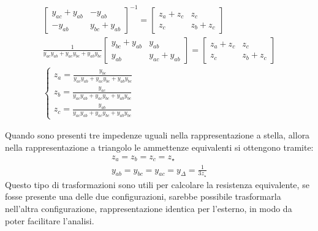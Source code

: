 \documentclass{article}
\numberwithin{equation}{subsection}
\begin{document}
\begin{gather*}
    \begin{bmatrix}
        y_{ac}+y_{ab}&-y_{ab}\\-y_{ab}&y_{bc}+y_{ab}
    \end{bmatrix}^{-1}=\begin{bmatrix}
        z_a+z_c&z_c\\z_c&z_b+z_c
    \end{bmatrix}\\
    \displaystyle\frac{1}{y_{ac}y_{ab}+y_{ac}y_{bc}+y_{ab}y_{bc}}\begin{bmatrix}
        y_{bc}+y_{ab}&y_{ab}\\y_{ab}&y_{ac}+y_{ab}
    \end{bmatrix}=\begin{bmatrix}
        z_a+z_c&z_c\\z_c&z_b+z_c
    \end{bmatrix}\\
    \begin{cases}
        z_a=\displaystyle\frac{y_{bc}}{y_{ac}y_{ab}+y_{ac}y_{bc}+y_{ab}y_{bc}}\\
        z_b=\displaystyle\frac{y_{ac}}{y_{ac}y_{ab}+y_{ac}y_{bc}+y_{ab}y_{bc}}\\
        z_c=\displaystyle\frac{y_{ab}}{y_{ac}y_{ab}+y_{ac}y_{bc}+y_{ab}y_{bc}}
    \end{cases}
\end{gather*}


Quando sono presenti tre impedenze uguali nella rappresentazione a stella, allora nella rappresentazione a triangolo le ammettenze equivalenti si ottengono tramite:
\begin{gather*}
    z_a=z_b=z_c=z_{\star}\\
    y_{ab}=y_{bc}=y_{ac}=y_{\Delta}=\displaystyle\frac{1}{3z_{\star}}
\end{gather*}
Questo tipo di trasformazioni sono utili per calcolare la resistenza equivalente, se fosse presente una delle due configurazioni, sarebbe possibile trasformarla 
nell'altra configurazione, rappresentazione identica per l'esterno, in modo da poter facilitare l'analisi. 


\end{document}
